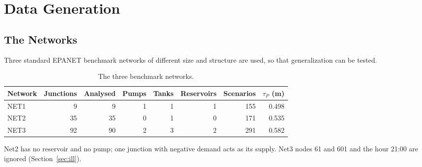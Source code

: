 \documentclass[11pt,letterpaper]{report}
\theoremstyle{definition}
\theoremstyle{plain}
\theoremstyle{remark}
\begin{document}
\chapter{Data Generation}
\section{The Networks}
Three standard EPANET benchmark networks of different size and structure are used, so that generalization can be tested.
\begin{table}[H]
\centering\small
\caption{The three benchmark networks.}\label{tab:networks}
\centering\setlength{\tabcolsep}{4pt}
\begin{tabular}{@{}lrrrrrrr@{}}
\toprule
Network & Junctions & Analysed & Pumps & Tanks & Reservoirs & Scenarios & $\tau_P$ (m) \\
\midrule
NET1 & 9 & 9 & 1 & 1 & 1 & 155 & 0.498 \\
NET2 & 35 & 35 & 0 & 1 & 0 & 171 & 0.535 \\
NET3 & 92 & 90 & 2 & 3 & 2 & 291 & 0.582 \\
\bottomrule
\end{tabular}
\end{table}
Net2 has no reservoir and no pump; one junction with negative demand acts as its supply. Net3 nodes 61 and 601 and the hour 21:00 are ignored (Section~\ref{sec:ill}).
\end{document}
